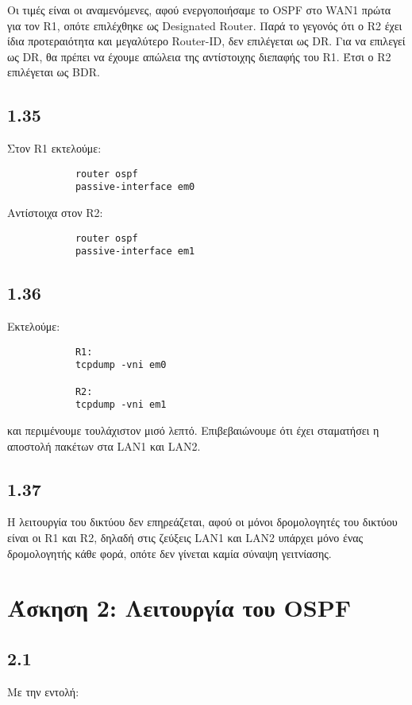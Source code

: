 \documentclass[a4paper, 12pt]{article}
\begin{document}
		Οι τιμές είναι οι αναμενόμενες, αφού ενεργοποιήσαμε το OSPF στο WAN1 πρώτα για τον R1, οπότε επιλέχθηκε ως Designated Router. Παρά το γεγονός ότι ο R2 έχει ίδια προτεραιότητα και μεγαλύτερο Router-ID, δεν επιλέγεται ως DR. Για να επιλεγεί ως DR, θα πρέπει να έχουμε απώλεια της αντίστοιχης διεπαφής του R1. Έτσι ο R2 επιλέγεται ως BDR.
		
	\subsection*{1.35}
		Στον R1 εκτελούμε:
		
		\begin{verbatim}
			router ospf
			passive-interface em0
		\end{verbatim}
		
		Αντίστοιχα στον R2:
		
		\begin{verbatim}
			router ospf
			passive-interface em1
		\end{verbatim}

	\subsection*{1.36}
		Εκτελούμε:
		
		\begin{verbatim}
			R1:
			tcpdump -vni em0
			
			R2:
			tcpdump -vni em1
		\end{verbatim}
		
		και περιμένουμε τουλάχιστον μισό λεπτό. Επιβεβαιώνουμε ότι έχει σταματήσει η αποστολή πακέτων στα LAN1 και LAN2.
		
	\subsection*{1.37}
		Η λειτουργία του δικτύου δεν επηρεάζεται, αφού οι μόνοι δρομολογητές του δικτύου είναι οι R1 και R2, δηλαδή στις ζεύξεις LAN1 και LAN2 υπάρχει μόνο ένας δρομολογητής κάθε φορά, οπότε δεν γίνεται καμία σύναψη γειτνίασης.

\section*{Άσκηση 2: Λειτουργία του OSPF}

	\subsection*{2.1}
		Με την εντολή: 
				
\end{document}
